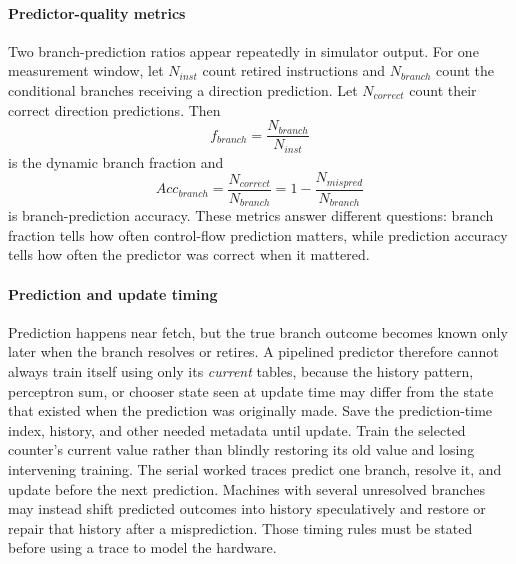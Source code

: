 \paragraph{Predictor-quality metrics}\label{par:auto-025e}
Two branch-prediction ratios appear repeatedly in simulator output.
For one measurement window, let $N_{inst}$ count retired instructions and $N_{branch}$ count the conditional branches receiving a direction prediction.
Let $N_{correct}$ count their correct direction predictions.
Then
\begin{equation}\label{eq:pipe-branch-fraction}
    f_{branch}=\frac{N_{branch}}{N_{inst}}
\end{equation}
is the dynamic branch fraction and
\begin{equation}\label{eq:pipe-branch-accuracy}
    Acc_{branch}=\frac{N_{correct}}{N_{branch}}=1-\frac{N_{mispred}}{N_{branch}}
\end{equation}
is branch-prediction accuracy.
These metrics answer different questions: branch fraction tells how often control-flow prediction matters, while prediction accuracy tells how often the predictor was correct when it mattered.

\paragraph{Prediction and update timing}\label{par:auto-025f}
Prediction happens near fetch, but the true branch outcome becomes known only later when the branch resolves or retires.
A pipelined predictor therefore cannot always train itself using only its \emph{current} tables, because the history pattern, perceptron sum, or chooser state seen at update time may differ from the state that existed when the prediction was originally made.
Save the prediction-time index, history, and other needed metadata until update.
Train the selected counter's current value rather than blindly restoring its old value and losing intervening training.
The serial worked traces predict one branch, resolve it, and update before the next prediction.
Machines with several unresolved branches may instead shift predicted outcomes into history speculatively and restore or repair that history after a misprediction.
Those timing rules must be stated before using a trace to model the hardware.


